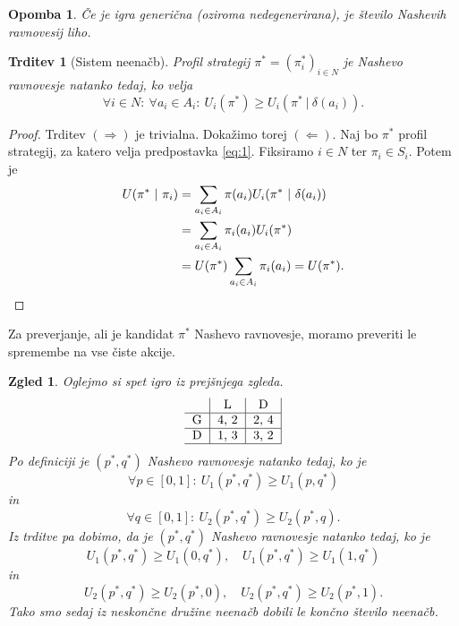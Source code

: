 \documentclass[10pt, a4paper]{article}
\newtheorem{trditev}[izr]{Trditev}
\newtheorem*{opomba}{Opomba}
\newtheorem{zgled}[izr]{Zgled}
\newenvironment{noticeC}{%
  \tcolorbox[%
  notitle,
  empty,
  enhanced,  %
  breakable,
  coltext=black, 
  fontupper=\rmfamily,
  parbox=false,
  noparskip,
  sharp corners,
  boxrule=-1pt,  %
  frame hidden,
  left=7pt,  %
  right=7pt,
  top=5pt,
  bottom=5pt,
  before skip=2.5ex plus 2pt,
  after skip=2.5ex plus 2pt,
  overlay unbroken and last={%
  },
  ]}
{\endtcolorbox}
\newenvironment{dokaz}%
  {\begin{noticeC}\begin{proof}}%
  {\end{proof}\end{noticeC}}
\begin{document}
\begin{opomba}
  Če je igra generična (oziroma nedegenerirana), je število Nashevih ravnovesij liho.
\end{opomba}

\begin{trditev}[Sistem neenačb]
  Profil strategij $\pi^* = (\pi^* _i)_{i \in N}$ je Nashevo ravnovesje natanko tedaj, ko velja 
  \begin{equation*}
    \forall i \in N:\ \forall a_i \in A_i:\ U_i (\pi^*) \geq U_i (\pi^*\ |\ \delta (a_i)). \label{eq:1}
  \end{equation*}
\end{trditev}

\begin{dokaz}
  Trditev $(\Rightarrow)$ je trivialna.
  Dokažimo torej $(\Leftarrow)$. Naj bo $\pi^*$ profil strategij, za katero velja predpostavka \ref{eq:1}.
  Fiksiramo $i \in N$ ter $\pi_i \in S_i$. Potem je 
  \begin{align*}
    U(\pi^*\ |\ \pi_i) &= \sum_{a_i \in A_i} \pi (a_i) U_i (\pi^*\ |\ \delta(a_i))\\
    &= \sum_{a_i \in A_i} \pi_i (a_i) U_i (\pi^*)\\
    &= U(\pi^*) \sum_{a_i \in A_i} \pi_i(a_i) = U(\pi^*). \qedhere
  \end{align*}
\end{dokaz}

Za preverjanje, ali je kandidat $\pi^*$ Nashevo ravnovesje, moramo preveriti le spremembe na vse čiste akcije.

\begin{zgled}
  Oglejmo si spet igro iz prejšnjega zgleda.
  $$
  \begin{tabular}{c|c|c|}
    & \textrm{L} & \textrm{D}\\
    \hline
    \textrm{G} & 4, 2 & 2, 4\\
    \hline
    \textrm{D} & 1, 3 & 3, 2\\
    \hline
  \end{tabular}
  $$
  Po definiciji je $(p^*, q^*)$ Nashevo ravnovesje natanko tedaj, ko je 
  $$\forall p \in [0, 1]:\ U_1 (p^*, q^*) \geq U_1 (p, q^*)$$
  in $$\forall q \in [0, 1]:\ U_2 (p^*, q^*) \geq U_2 (p^*, q).$$
  Iz trditve pa dobimo, da je $(p^*, q^*)$ Nashevo ravnovesje natanko tedaj, ko je 
  $$U_1 (p^*, q^*) \geq U_1 (0, q^*),\quad U_1 (p^*, q^*) \geq U_1 (1, q^*)$$ in 
  $$U_2 (p^*, q^*) \geq U_2 (p^*, 0),\quad U_2 (p^*, q^*) \geq U_2 (p^*, 1).$$
  Tako smo sedaj iz neskončne družine neenačb dobili le končno število neenačb.
\end{zgled}
\end{document}
